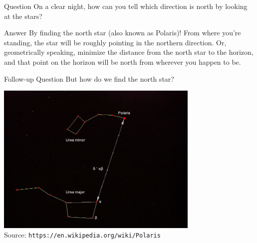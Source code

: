 \documentclass[compress,aspectratio=169,10pt,usenames,dvipsnames]{beamer}
\begin{document}
\begin{frame}

\vfill

\begin{block}{Question}
On a clear night, how can you tell which direction is north by looking at the stars? 
\end{block}

\vfill

\begin{block}{Answer}
By finding the north star (also known as Polaris)! From where you're standing, the star will be roughly pointing in the northern direction. Or, geometrically speaking, minimize the distance from the north star to the horizon, and that point on the horizon will be north from wherever you happen to be. 
\end{block}

\vfill

\begin{block}{Follow-up Question}
But how do we find the north star?
\end{block}

\vfill



\end{frame}


\begin{frame}

\begin{center}
\includegraphics[width=0.73\textwidth]{Polaris} \\
{\tiny Source: {\tt https://en.wikipedia.org/wiki/Polaris}}
\end{center}

\end{frame}
\end{document}
